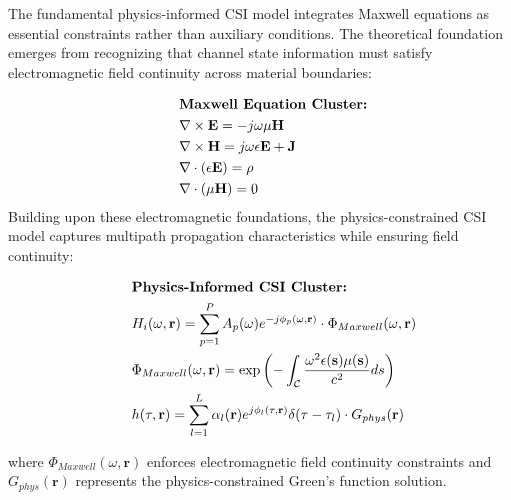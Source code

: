\documentclass[journal]{IEEEtran}
\begin{document}
The fundamental physics-informed CSI model integrates Maxwell equations as essential constraints rather than auxiliary conditions. The theoretical foundation emerges from recognizing that channel state information must satisfy electromagnetic field continuity across material boundaries:

\begin{align}
&\hspace{2em}\text{\textbf{Maxwell Equation Cluster:}} \nonumber \\
&\hspace{2em}\nabla \times \mathbf{E} = -j\omega \mu \mathbf{H} \label{eq:maxwell_faraday_v4} \\
&\hspace{2em}\nabla \times \mathbf{H} = j\omega \epsilon \mathbf{E} + \mathbf{J} \label{eq:maxwell_ampere_v4} \\
&\hspace{2em}\nabla \cdot (\epsilon \mathbf{E}) = \rho \label{eq:maxwell_gauss_v4} \\
&\hspace{2em}\nabla \cdot (\mu \mathbf{H}) = 0 \label{eq:maxwell_magnetic_v4}
\end{align}
Building upon these electromagnetic foundations, the physics-constrained CSI model captures multipath propagation characteristics while ensuring field continuity:

\begin{align}
&\hspace{2em} \text{\textbf{Physics-Informed CSI Cluster:}} \nonumber \\
&\hspace{2em} H_i(\omega,\mathbf{r}) = \sum_{p=1}^{P} A_p(\omega) e^{-j\phi_p(\omega,\mathbf{r})} \cdot \Phi_{Maxwell}(\omega,\mathbf{r}) \label{eq:csi_physics_v4} \\
&\hspace{2em} \Phi_{Maxwell}(\omega,\mathbf{r}) = \exp\left(-\int_{\mathcal{C}} \frac{\omega^2 \epsilon(\mathbf{s}) \mu(\mathbf{s})}{c^2} ds\right) \label{eq:maxwell_constraint_v4} \\
&\hspace{2em} h(\tau,\mathbf{r}) = \sum_{l=1}^{L} \alpha_l(\mathbf{r}) e^{j\phi_l(\tau,\mathbf{r})} \delta(\tau - \tau_l) \cdot G_{phys}(\mathbf{r}) \label{eq:cir_physics_v4}
\end{align}

where $\Phi_{Maxwell}(\omega,\mathbf{r})$ enforces electromagnetic field continuity constraints and $G_{phys}(\mathbf{r})$ represents the physics-constrained Green's function solution.
\end{document}
